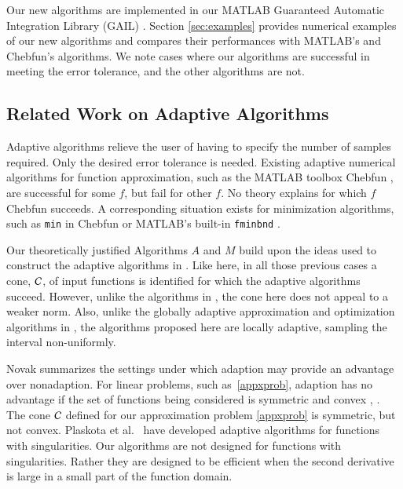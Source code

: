 \documentclass[review]{elsarticle}
\theoremstyle{definition}
\begin{document}
Our new algorithms are implemented in our MATLAB Guaranteed
Automatic Integration Library (GAIL) \cite{ChoEtal15a}. Section \ref{sec:examples} provides numerical examples
of our new algorithms and compares their performances with MATLAB's and
Chebfun's algorithms. We note cases where our algorithms are successful in
meeting the error tolerance, and the other algorithms are not.

\subsection{Related Work on Adaptive Algorithms}
Adaptive algorithms relieve the user of having to specify the number of samples
required. Only the desired error tolerance is needed. Existing adaptive
numerical algorithms for function approximation, such as the MATLAB toolbox
Chebfun \citep{TrefEtal16a}, are successful for some $f$, but fail for other
$f$. No theory explains for which $f$ Chebfun succeeds. A corresponding
situation exists for minimization algorithms, such as \texttt{min} in Chebfun or
MATLAB's built-in \texttt{fminbnd} \citep{MAT9.0}.

Our theoretically justified Algorithms $A$ and $M$ build upon the ideas used to construct the adaptive algorithms in \cite{HicEtal14b, Din15a, HicEtal14a, HicJim16a, Jia16a, JimHic16a,Ton14a}.  Like here, in all those previous cases a cone, $\mathcal{C}$, of input functions is identified for which the adaptive algorithms succeed.  However, unlike the algorithms in \cite{HicEtal14b, Din15a, HicEtal14a,Ton14a}, the cone here does not appeal to a weaker norm.  Also, unlike the globally adaptive approximation and optimization algorithms in \cite{HicEtal14b,Ton14a}, the algorithms proposed here are locally adaptive, sampling the interval non-uniformly.

Novak \cite{Nov96a} summarizes the settings under which adaption may provide an
advantage over nonadaption. For linear problems, such as~\eqref{appxprob},
adaption has no advantage if the set of functions being considered is symmetric
and convex \cite[Theorem 1]{Nov96a}, \cite[Chapter 4, Theorem
5.2.1]{TraWasWoz88}. The cone $\mathcal{C}$ defined for our approximation problem \eqref{appxprob}
is symmetric, but not convex. Plaskota et al.~\cite{PlaEtal08a} have developed
adaptive algorithms for functions with singularities. Our algorithms are not
designed for functions with singularities. Rather they are designed to be
efficient when the second derivative is large in a small part of the function
domain.  
\end{document}
